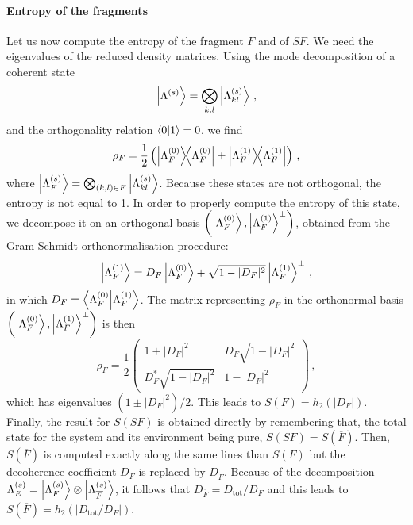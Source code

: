 \paragraph*{Entropy of the fragments}
Let us now compute the entropy of the fragment $F$ and of $SF$.
We need the eigenvalues of the reduced density matrices.
Using the mode decomposition of a coherent state
%
\begin{equation}
	\ket{\Lambda^{(s)}} = \bigotimes_{k,l}\ket{\Lambda^{(s)}_{kl}} \, ,
\end{equation}
and the orthogonality relation $\braket{0}{1}=0$, we find
%
\begin{equation}
\rho_F = \frac{1}{2}\left(
	\ketbra{\Lambda^{(0)}_F}
	+\ketbra{\Lambda^{(1)}_F}
\right)
\,,
\end{equation}
where $\ket{\Lambda^{(s)}_F} = \bigotimes_{(k,l) \in F}\ket{\Lambda^{(s)}_{kl}}$.
Because these states are not orthogonal, the entropy is not equal to \SI{1}{\bit}.
In order to properly compute the entropy of this
state, we decompose it on an orthogonal basis
$\left(\ket{\Lambda^{(0)}_F},\ket{\Lambda^{(1) }_F}^\perp\right)$, obtained from
the Gram-Schmidt orthonormalisation procedure:
%
\begin{equation}
\ket{\Lambda^{(1)}_F} = D_F \ket{\Lambda^{(0)}_F} + 
	\sqrt{1-|D_F|^2} \ket{\Lambda^{(1) }_F}^\perp
\,,
\end{equation}
in which $D_F = \braket{\Lambda^{(0)}_F}{\Lambda^{(1)}_F}$. The matrix
representing $\rho_F$ in the orthonormal basis $\left(\ket{\Lambda^{(0)}_F},
\ket{\Lambda^{(1) }_F}^\perp \right)$ is then
%
\begin{equation}
\rho_F  =  \frac{1}{2}
\begin{pmatrix}
1+|D_F|^2 & D_F\sqrt{1-|D_F|^2} \\
D_F^*\sqrt{1-|D_F|^2}  
	& 1-|D_F|^2
\end{pmatrix}\, ,
\end{equation}
which has eigenvalues $(1 \pm |D_F|^2)/2$. This leads to
$S(F) = h_2(|D_F|)$. Finally, the result for $S(SF)$ is
obtained directly by remembering that, the total state for the
system and its environment being pure, $S(SF)=S(\overline{F})$.
Then, $S(\overline{F})$ is computed exactly along the same lines than
$S(F)$ but the decoherence coefficient $D_F$ is replaced by
$D_{\overline{F}}$. Because of the decomposition $\Lambda_E^{(s)}=
\ket{\Lambda_F^{(s)}} \otimes\ket{\Lambda_{\overline{F}}^{(s)}}$, 
it follows that $D_{\overline{F}}=D_{\text{tot}}/D_F$ and this 
leads to $S(\overline{F}) = h_2(|D_{\text{tot}}/D_F|)$.

